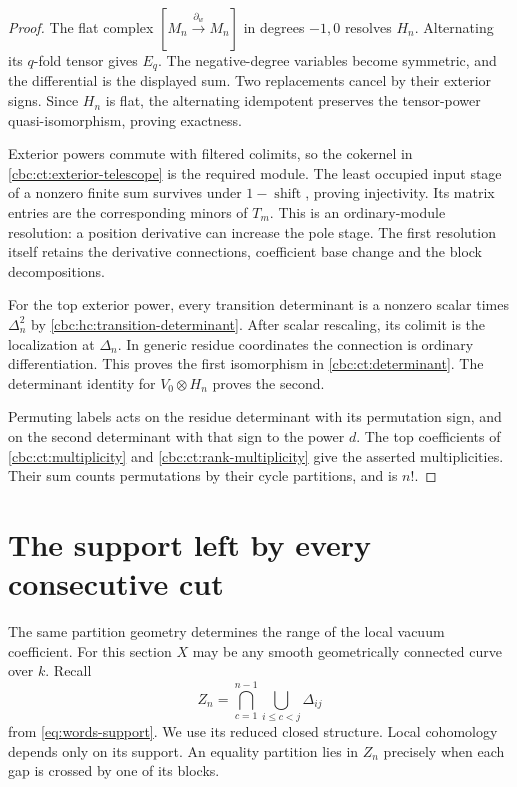 \begin{proof}
The flat complex $[M_n\xrightarrow{\partial_w}M_n]$ in
degrees $-1,0$ resolves $H_n$. Alternating its $q$-fold
tensor gives $E_q$. The negative-degree variables become
symmetric, and the differential is the displayed sum. Two
replacements cancel by their exterior signs. Since $H_n$ is
flat, the alternating idempotent preserves the tensor-power
quasi-isomorphism, proving exactness.

Exterior powers commute with filtered colimits, so the
cokernel in \eqref{cbc:ct:exterior-telescope} is the required
module. The least occupied input stage of a nonzero finite
sum survives under $1-\operatorname{shift}$, proving
injectivity. Its matrix entries are the corresponding minors
of $T_m$. This is an ordinary-module resolution: a position
derivative can increase the pole stage. The first resolution
itself retains the derivative connections, coefficient base
change and the block decompositions.

For the top exterior power, every transition determinant is a
nonzero scalar times $\Delta_n^2$ by
\eqref{cbc:hc:transition-determinant}. After scalar rescaling,
its colimit is the localization at $\Delta_n$. In generic
residue coordinates the connection is ordinary differentiation.
This proves the first isomorphism in \eqref{cbc:ct:determinant}.
The determinant identity for $V_0\otimes H_n$ proves the
second.

Permuting labels acts on the residue determinant with
its permutation sign, and on the second determinant with that
sign to the power $d$. The top coefficients of
\eqref{cbc:ct:multiplicity} and
\eqref{cbc:ct:rank-multiplicity} give the asserted multiplicities.
Their sum counts permutations by their cycle partitions, and
is $n!$.
\end{proof}

\section{The support left by every consecutive cut}
\label{cbc:ct:support}

The same partition geometry determines the range of the local
vacuum coefficient. For this section $X$ may be any smooth
geometrically connected curve over $k$. Recall
\[
 Z_n=\bigcap_{c=1}^{n-1}\bigcup_{i\leq c<j}\Delta_{ij}
\]
from \eqref{eq:words-support}. We use its reduced closed
structure. Local cohomology depends only on its support. An
equality partition lies in $Z_n$ precisely when each gap is
crossed by one of its blocks.

